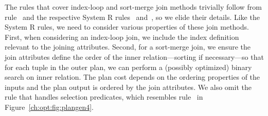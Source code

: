 %
%
%

The rules that cover index-loop and sort-merge join methods trivially follow
from rule~ and the respective System R rules~ and~, so
we elide their details.  Like the System R rules, we need to consider various
properties of these join methods.  First, when considering an index-loop join,
we include the index definition relevant to the joining attributes.  Second,
for a sort-merge join, we ensure the join attributes define the order of the
inner relation---sorting if necessary---so that for each tuple in the outer
plan, we can perform a (possibly optimized) binary search on inner relation.
The plan cost depends on the ordering properties of the inputs and the plan
output is ordered by the join attributes.  We also omit the rule that handles
selection predicates, which resembles rule~ in
Figure~\ref{ch:opt:fig:plangen4}.


